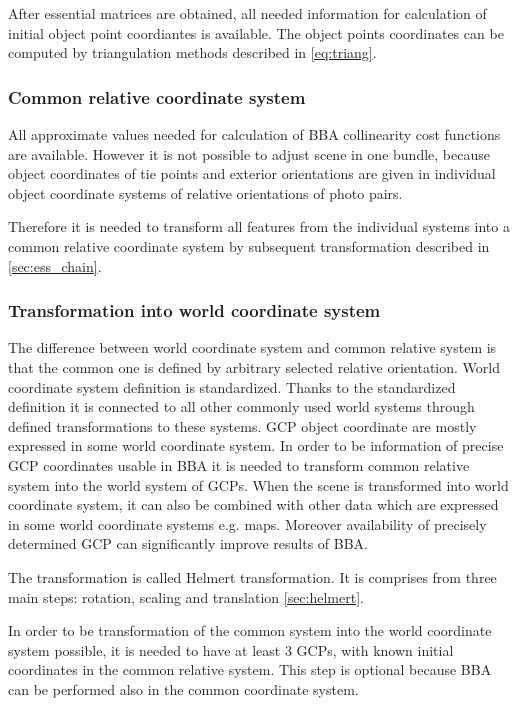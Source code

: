 \documentclass[a4paper,12pt]{article}
\begin{document}
After essential matrices are obtained, all needed information for calculation of initial object point coordiantes
is  available. The object points coordinates can be computed by triangulation methods described in \ref{eq:triang}.


\subsubsection{Common relative coordinate system}

All approximate values needed for calculation of BBA collinearity cost functions are available. 
However it is not possible to adjust scene in one bundle, because
object coordinates of tie points and exterior orientations are given in individual object coordinate systems
of relative orientations of photo pairs.

Therefore it is needed to transform all features from the individual systems into 
a common relative coordinate system by subsequent transformation described in \ref{sec:ess_chain}. 

\subsubsection{Transformation into world coordinate system}

The difference between world coordinate system and common relative system is that the common one 
is defined by arbitrary selected relative orientation. World coordinate system definition is standardized.
Thanks to the standardized definition it is connected to all other commonly used  world systems through 
defined transformations to these systems.
GCP object coordinate are mostly expressed in some world coordinate system. In order to be 
information of precise GCP coordinates usable in BBA it is needed to transform common relative 
system into the world system of GCPs. When the scene is transformed into world coordinate system,
it can also be combined with other data which are expressed in some world coordinate systems e.g.
maps. Moreover availability of precisely determined GCP can significantly improve results of BBA.  


The transformation is called Helmert transformation. It is comprises from 
three main steps: rotation, scaling and translation \ref{sec:helmert}.

In order to be transformation of the common system into the world coordinate system possible, it is needed 
to have at least 3 GCPs, with known initial coordinates in the common relative system. 
This step is optional because  BBA can be performed also in the common coordinate system. 
\end{document}
